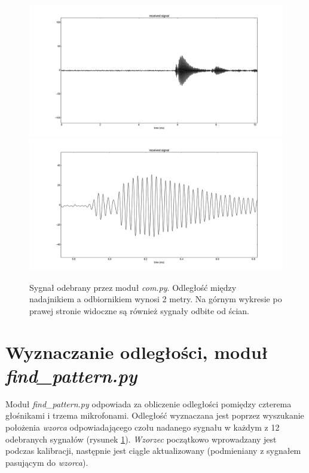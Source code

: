 \begin{figure}[h!]
    \centering
    \includegraphics[width=1.15\textwidth, trim= 47mm 0mm 0mm 0mm,clip]{com_output_2m_1}
    \includegraphics[width=1.15\textwidth, trim= 47mm 0mm 0mm 0mm,clip]{com_output_2m_2}
    \caption{Sygnał odebrany przez moduł \textit{com.py}. 
    Odległość między nadajnikiem a odbiornikiem wynosi 2 metry.
    Na górnym wykresie po prawej stronie widoczne są również sygnały odbite od ścian.
    }
    \label{fig:com_output_2m}
\end{figure}


\section{Wyznaczanie odległości, moduł \textit{find\_pattern.py}}

Moduł \textit{find\_pattern.py} odpowiada za obliczenie odległości pomiędzy czterema głośnikami i trzema mikrofonami.
Odległość wyznaczana jest poprzez wyszukanie położenia \textit{wzorca} odpowiadającego czołu nadanego sygnału 
w każdym z 12 odebranych sygnałów (rysunek \ref{fig:com_output_2m}).
\textit{Wzorzec} początkowo wprowadzany jest podczas kalibracji, następnie jest ciągle aktualizowany 
(podmieniany z sygnałem pasującym do \textit{wzorca}).

